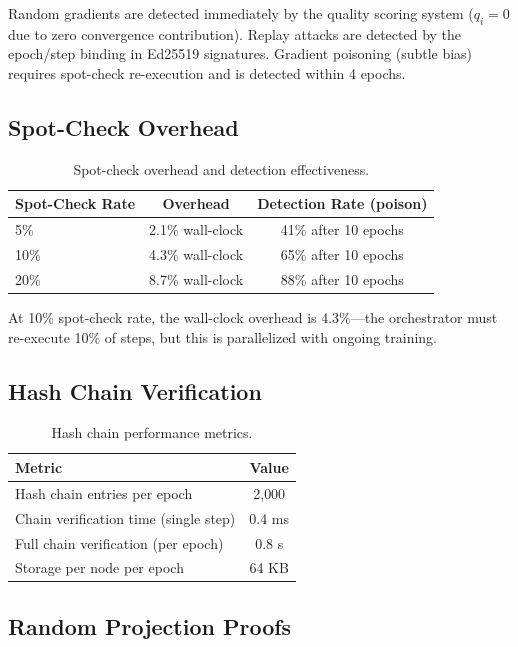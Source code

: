 \documentclass[11pt,letterpaper]{article}
\begin{document}
Random gradients are detected immediately by the quality scoring system ($q_i = 0$ due to zero convergence contribution).  Replay attacks are detected by the epoch/step binding in Ed25519 signatures.  Gradient poisoning (subtle bias) requires spot-check re-execution and is detected within 4 epochs.

\subsection{Spot-Check Overhead}

\begin{table}[t]
\centering
\begin{tabular}{lcc}
\toprule
\textbf{Spot-Check Rate} & \textbf{Overhead} & \textbf{Detection Rate (poison)} \\
\midrule
5\% & 2.1\% wall-clock & 41\% after 10 epochs \\
10\% & 4.3\% wall-clock & 65\% after 10 epochs \\
20\% & 8.7\% wall-clock & 88\% after 10 epochs \\
\bottomrule
\end{tabular}
\caption{Spot-check overhead and detection effectiveness.}
\label{tab:overhead}
\end{table}

At 10\% spot-check rate, the wall-clock overhead is 4.3\%---the orchestrator must re-execute 10\% of steps, but this is parallelized with ongoing training.

\subsection{Hash Chain Verification}

\begin{table}[t]
\centering
\begin{tabular}{lc}
\toprule
\textbf{Metric} & \textbf{Value} \\
\midrule
Hash chain entries per epoch & 2{,}000 \\
Chain verification time (single step) & 0.4 ms \\
Full chain verification (per epoch) & 0.8 s \\
Storage per node per epoch & 64 KB \\
\bottomrule
\end{tabular}
\caption{Hash chain performance metrics.}
\label{tab:hashchain}
\end{table}

\subsection{Random Projection Proofs}
\end{document}
